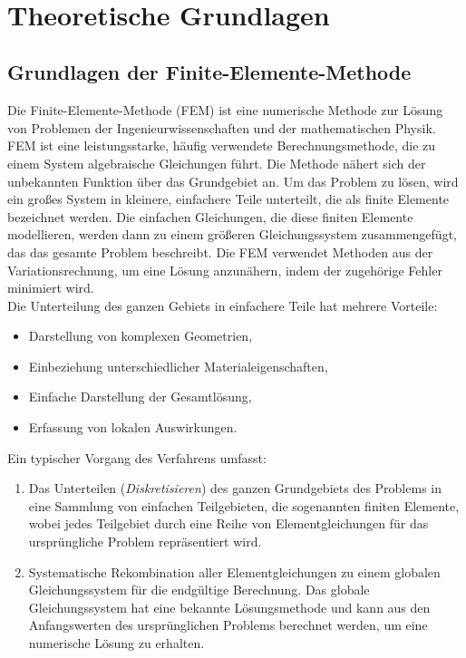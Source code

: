 \documentclass[a4paper,10pt,twoside]{article}
\numberwithin{equation}{section} %
\numberwithin{figure}{section}   %
\numberwithin{table}{section}    %
\begin{document}
	\newpage
	\pagestyle{empty}
	\ \\
	\newpage
	\pagestyle{fancy}
	\section{Theoretische Grundlagen} \label{sec:Theoretische Grundlagen}
	\subsection{Grundlagen der Finite-Elemente-Methode}\label{sec:Grundlagen-FEM}
	Die Finite-Elemente-Methode (FEM) ist eine numerische Methode zur Lösung von Problemen der Ingenieurwissenschaften und der mathematischen Physik. FEM ist eine leistungsstarke, häufig verwendete Berechnungsmethode, die zu einem System algebraische Gleichungen führt. Die Methode nähert sich der unbekannten Funktion über das Grundgebiet an. Um das Problem zu lösen, wird ein großes System in kleinere, einfachere Teile unterteilt, die als finite Elemente bezeichnet werden. Die einfachen Gleichungen, die diese finiten Elemente modellieren, werden dann zu einem größeren Gleichungssystem zusammengefügt, das das gesamte Problem beschreibt. Die FEM verwendet Methoden aus der Variationsrechnung, um eine Lösung anzunähern, indem der zugehörige Fehler minimiert wird.\\
	
	Die Unterteilung des ganzen Gebiets in einfachere Teile hat mehrere Vorteile:
	\begin{itemize}
		\item Darstellung von komplexen Geometrien,
		\item Einbeziehung unterschiedlicher Materialeigenschaften,
		\item Einfache Darstellung der Gesamtlösung,
		\item Erfassung von lokalen Auswirkungen.
	\end{itemize}
	
	Ein typischer Vorgang des Verfahrens umfasst:
	\begin{enumerate}
		\item Das Unterteilen (\textit{Diskretisieren}) des ganzen Grundgebiets des Problems in eine Sammlung von einfachen Teilgebieten, die sogenannten finiten Elemente, wobei jedes Teilgebiet durch eine Reihe von Elementgleichungen für das ursprüngliche Problem repräsentiert wird.
		\item Systematische Rekombination aller Elementgleichungen zu einem globalen Gleichungssystem für die endgültige Berechnung. Das globale Gleichungssystem hat eine bekannte Lösungsmethode und kann aus den Anfangswerten des ursprünglichen Problems berechnet werden, um eine numerische Lösung zu erhalten.
	\end{enumerate}
	
\end{document}
